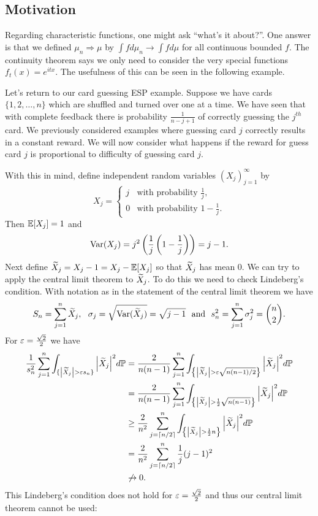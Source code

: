\subsection{Motivation}
Regarding characteristic functions, one might ask ``what's it about?''. One answer is that we defined $\mu_n \Rightarrow \mu$ by $\int f d\mu_n \to \int f d\mu$ for all continuous bounded $f$. The continuity theorem says we only need to consider the very special functions $f_t(x) = e^{itx}$. The usefulness of this can be seen in the following example.
\begin{ex}
    Let's return to our card guessing ESP example. Suppose we have cards $\{1,2,\ldots, n\}$ which are shuffled and turned over one at a time. We have seen that with complete feedback there is probability $\frac{1}{n-j+1}$ of correctly guessing the $j^{th}$ card. We previously considered examples where guessing card $j$ correctly results in a constant reward. We will now consider what happens if the reward for guess card $j$ is proportional to difficulty of guessing card $j$. 

    With this in mind, define independent random variables $(X_j)_{j=1}^\infty$ by
    \[X_j = \begin{cases}
        j & \text{with probability } \frac{1}{j},\\
        0 & \text{with probability } 1-\frac{1}{j}.
    \end{cases} \]
    Then ${\mathbb{E}}[X_j]=1$ and 
    \[\operatorname{Var}(X_j) = j^2\left(\frac{1}{j}\left(1-\frac{1}{j}\right)\right) = j-1. \]
    Next define $\widetilde{X}_j = X_j-1=X_j-{\mathbb{E}}[X_j]$ so that $\widetilde{X}_j$ has mean 0. We can try to apply the central limit theorem to $\widetilde{X}_j$. To do this we need to check Lindeberg's condition. With notation as in the statement of the central limit theorem we have
    \[S_n = \sum_{j=1}^n \widetilde{X}_j, ~~\sigma_j = \sqrt{\operatorname{Var}(\widetilde{X}_j)} = \sqrt{j-1}~~ \text{and}~~s_n^2 = \sum_{j=1}^n \sigma_j^2 = \binom{n}{2}.\]
    For $\varepsilon = \frac{\sqrt{2}}{2}$ we have 
    \begin{align*}
        \frac{1}{s_n^2}\sum_{j=1}^n \int_{\{{\left\lvert\widetilde{X}_j\right\rvert} > \varepsilon s_n\}}{\left\lvert\widetilde{X}_j\right\rvert}^2 d{\mathbb{P}} &=\frac{2}{n(n-1)}\sum_{j=1}^n \int_{\left\{{\left\lvert\widetilde{X}_j\right\rvert} > \varepsilon\sqrt{n(n-1)/2}\right\}}{\left\lvert\widetilde{X}_j\right\rvert}^2 d{\mathbb{P}}\\
        &= \frac{2}{n(n-1)}\sum_{j=1}^n \int_{\left\{{\left\lvert\widetilde{X}_j\right\rvert} > \frac{1}{2}\sqrt{n(n-1)}\right\}}{\left\lvert\widetilde{X}_j\right\rvert}^2 d{\mathbb{P}}\\
        &\ge \frac{2}{n^2}\sum_{j = \lceil n/2 \rceil}^n \int_{\left\{{\left\lvert\widetilde{X}_j\right\rvert} > \frac{1}{2}n\right\}}{\left\lvert\widetilde{X}_j\right\rvert}^2 d{\mathbb{P}}\\
        &=\frac{2}{n^2} \sum_{j = \lceil n/2 \rceil}^n \frac{1}{j}(j-1)^2\\
        &\not\to  0.
    \end{align*}
    This Lindeberg's condition does not hold for $\varepsilon = \frac{\sqrt{2}}{2}$ and thus our central limit theorem cannot be used:
    

\end{ex}
